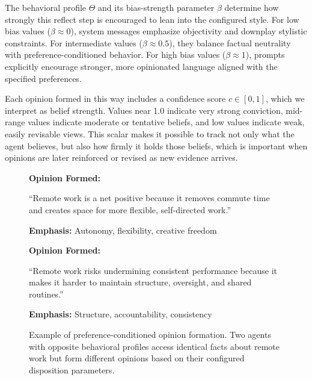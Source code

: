 The behavioral profile $\Theta$ and its bias-strength parameter $\beta$ determine how strongly this reflect step is encouraged to lean into the configured style. For low bias values ($\beta \approx 0$), system messages emphasize objectivity and downplay stylistic constraints. For intermediate values ($\beta \approx 0.5$), they balance factual neutrality with preference-conditioned behavior. For high bias values ($\beta \approx 1$), prompts explicitly encourage stronger, more opinionated language aligned with the specified preferences.

Each opinion formed in this way includes a confidence score $c \in [0,1]$, which we interpret as belief strength. Values near 1.0 indicate very strong conviction, mid-range values indicate moderate or tentative beliefs, and low values indicate weak, easily revisable views. This scalar makes it possible to track not only what the agent believes, but also how firmly it holds those beliefs, which is important when opinions are later reinforced or revised as new evidence arrives.

\begin{figure}[t]
\centering
\begin{tcolorbox}[
    colback=teal!5!white,
    colframe=teal!60!black,
    title={Trusting, Flexible, Empathetic Profile ($S=1, L=2, E=5$)},
    fonttitle=\bfseries,
    coltitle=white,
    colbacktitle=teal!60!black,
    boxrule=0.8pt,
    arc=1mm,
    enhanced,
    width=0.95\linewidth
]
\textbf{Opinion Formed:}

``Remote work is a net positive because it removes commute time and creates space for more flexible, self-directed work.''

\textbf{Emphasis:} Autonomy, flexibility, creative freedom
\end{tcolorbox}

\vspace{0.3cm}

\begin{tcolorbox}[
    colback=teal!5!white,
    colframe=teal!60!black,
    title={Skeptical, Literal, Detached Profile ($S=5, L=5, E=1$)},
    fonttitle=\bfseries,
    coltitle=white,
    colbacktitle=teal!60!black,
    boxrule=0.8pt,
    arc=1mm,
    enhanced,
    width=0.95\linewidth
]
\textbf{Opinion Formed:}

``Remote work risks undermining consistent performance because it makes it harder to maintain structure, oversight, and shared routines.''

\textbf{Emphasis:} Structure, accountability, consistency
\end{tcolorbox}

\caption{Example of preference-conditioned opinion formation. Two agents with opposite behavioral profiles access identical facts about remote work but form different opinions based on their configured disposition parameters.}
\label{fig:preference-conditioned-opinions}
\end{figure}


